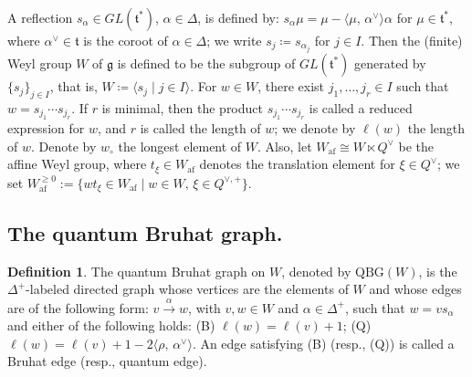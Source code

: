 \documentclass[11pt,a4paper,reqno,dvipdfmx]{amsart}
\numberwithin{equation}{section}
\newcommand{\Fg}{\mathfrak{g}}
\newcommand{\Ft}{\mathfrak{t}}
\newcommand{\af}{\mathrm{af}}
\newcommand{\QBG}{\mathrm{QBG}}
\newcommand{\edge}[1]{ \xrightarrow{\hspace{2pt}#1\hspace{2pt}} }
\newcommand{\lng}{w_{\circ}}
\newcommand{\pair}[2]{\langle #1,\,#2 \rangle}
\theoremstyle{plain}
\theoremstyle{definition}
\newtheorem{dfn}[lem]{Definition}
\theoremstyle{remark}
\begin{document}
A reflection $s_{\alpha} \in GL(\Ft^{\ast})$, $\alpha \in \Delta$, 
is defined by: $s_{\alpha} \mu = \mu - \pair{\mu}{\alpha^{\vee}} \alpha$ 
for $\mu \in \Ft^{\ast}$, where $\alpha^{\vee} \in \Ft$ is the coroot of $\alpha \in \Delta$; 
we write $s_{j} \coloneqq   s_{\alpha_{j}}$ for $j \in I$. 
Then the (finite) Weyl group $W$ of $\Fg$ is defined to be the subgroup of $GL(\Ft^{\ast})$ 
generated by $\{ s_{j} \}_{j \in I}$, that is, $W \coloneqq   \langle s_{j} \mid j \in I \rangle$. 
For $w \in W$, there exist $j_{1}, \ldots, j_{r} \in I$ such that $w = s_{j_{1}} \cdots s_{j_{r}}$. 
If $r$ is minimal, then the product $s_{j_{1}} \cdots s_{j_{r}}$ is called a reduced expression for $w$, 
and $r$ is called the length of $w$; we denote by $\ell(w)$ the length of $w$. 
Denote by $\lng$ the longest element of $W$. 
%
Also, let $W_{\af} \cong W \ltimes Q^{\vee}$ be the affine Weyl group, 
where $t_{\xi} \in W_{\af}$ denotes the translation element for $\xi \in Q^{\vee}$; 
we set $W_{\af}^{\geq 0} := 
\bigl\{w t_{\xi} \in W_{\af} \mid w \in W,\,\xi \in Q^{\vee,+} \bigr\}$. 

%
\subsection{The quantum Bruhat graph.}
\label{subsec:QBG}

\begin{dfn} \label{dfn:QBG} %
The quantum Bruhat graph on $W$, 
denoted by $\QBG(W)$, is the $\Delta^{+}$-labeled
directed graph whose vertices are the elements of $W$ and 
whose edges are of the following form: 
$v \edge{\alpha} w$, with $v, w \in W$ and $\alpha \in \Delta^{+}$, 
such that $w = v s_{\alpha}$ and either of the following holds: 
(B) $\ell(w) = \ell (v) + 1$; 
(Q) $\ell(w) = \ell (v) + 1 - 2 \pair{\rho}{\alpha^{\vee}}$.
An edge satisfying (B) (resp., (Q)) is called a Bruhat edge (resp., quantum edge). 
\end{dfn}
\end{document}
